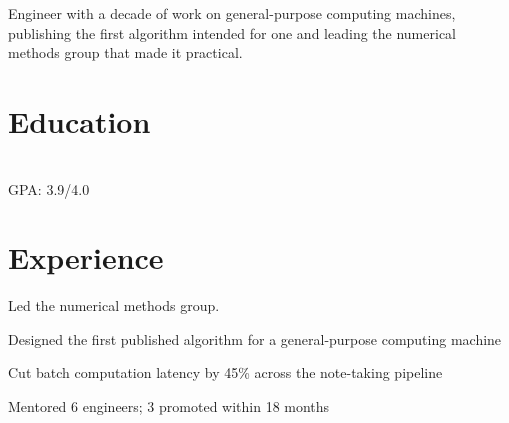 \documentclass[]{deedy-resume-openfont}
\begin{document}
%
%
      
\vspace{-8pt}
{\raggedright Engineer with a decade of work on general-purpose computing machines, publishing the first algorithm intended for one and leading the numerical methods group that made it practical.\par}
\sectionsep
%
%
\vspace{3pt}
\section{Education}
\raggedright

    \hfill {}\\
    GPA: 3.9/4.0\\
    \sectionsep
      \vspace{3pt}
      \section{Experience}
      \hfill {}
          \par Led the numerical methods group.
          \begin{tightemize}
  \setlength\itemsep{2pt}
  \item Designed the first published algorithm for a general-purpose computing machine
  \item Cut batch computation latency by 45\% across the note-taking pipeline
  \item Mentored 6 engineers; 3 promoted within 18 months
\end{tightemize}
          \sectionsep
      \hfill {}
          
\end{document}
